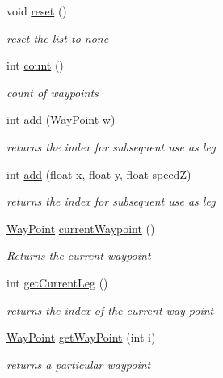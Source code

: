 \begin{DoxyCompactItemize}
void \mbox{\hyperlink{class_r_c___framework_1_1_way_point_list_a36f22f05e0d900f4acc2a7a8239b2227}{reset}} ()
\begin{DoxyCompactList}\small\item\em reset the list to none \end{DoxyCompactList}\item 
int \mbox{\hyperlink{class_r_c___framework_1_1_way_point_list_abfc790ca406453c0cddea8c03203ea3d}{count}} ()
\begin{DoxyCompactList}\small\item\em count of waypoints \end{DoxyCompactList}\item 
int \mbox{\hyperlink{class_r_c___framework_1_1_way_point_list_a04cecc3f9a75ae9eb80bdb9d0bb088d3}{add}} (\mbox{\hyperlink{class_r_c___framework_1_1_way_point}{Way\+Point}} w)
\begin{DoxyCompactList}\small\item\em returns the index for subsequent use as leg \end{DoxyCompactList}\item 
int \mbox{\hyperlink{class_r_c___framework_1_1_way_point_list_a17e0452280771d013bbdd3d97aadc0a1}{add}} (float x, float y, float speedZ)
\begin{DoxyCompactList}\small\item\em returns the index for subsequent use as leg \end{DoxyCompactList}\item 
\mbox{\hyperlink{class_r_c___framework_1_1_way_point}{Way\+Point}} \mbox{\hyperlink{class_r_c___framework_1_1_way_point_list_a788fadcbf3ca059b956f292966788237}{current\+Waypoint}} ()
\begin{DoxyCompactList}\small\item\em Returns the current waypoint \end{DoxyCompactList}\item 
int \mbox{\hyperlink{class_r_c___framework_1_1_way_point_list_abba1a4cdc76bdb8206f8b5e4455b7ad0}{get\+Current\+Leg}} ()
\begin{DoxyCompactList}\small\item\em returns the index of the current way point \end{DoxyCompactList}\item 
\mbox{\hyperlink{class_r_c___framework_1_1_way_point}{Way\+Point}} \mbox{\hyperlink{class_r_c___framework_1_1_way_point_list_aefb59feb76973b2a903d342618350896}{get\+Way\+Point}} (int i)
\begin{DoxyCompactList}\small\item\em returns a particular waypoint \end{DoxyCompactList}\item 

\end{DoxyCompactItemize}
